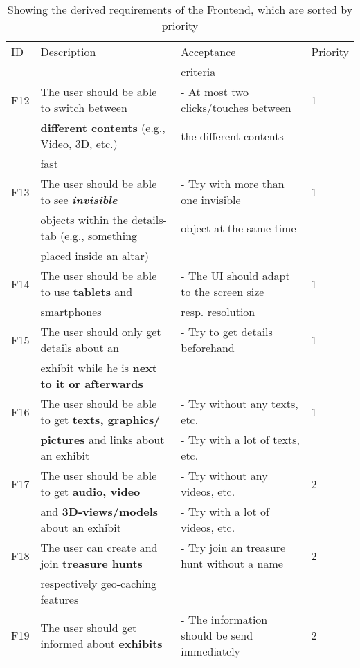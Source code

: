 \documentclass[twoside,openright,fleqn,pointlessnumbers,headinclude,,11pt,a4paper,BCOR5mm,footinclude,cleardoubleempty,abstracton %
                ]{scrreprt}
\begin{document}
	\begin{table}[h]
			\caption{Showing the derived requirements of the Frontend, which are sorted by priority}
	\centering%
	\begin{tabular}{llll}
		\hline
	ID 	& Description 	& Acceptance 	& Priority \\
	 	& 			 & criteria 	&  \\
	\hline
	F12 & The user should be able to switch between 			& - At most two clicks/touches between  	& 1\\
		& \textbf{different contents} (e.g., Video, 3D, etc.)		& the different contents	& \\
		& fast										&	& \\
	\hline
	F13 & The user should be able to see \textbf{\textit{invisible}} 	& - Try with more than one invisible 	& 1\\
		& objects within the details-tab (e.g., something			& object at the same time	& \\
		& placed inside an altar)								&	& \\
	\hline
	F14 & The user should be able to use \textbf{tablets} and 		& - The UI should adapt to the screen size  	& 1\\
		& smartphones									& resp. resolution	& \\
	\hline
	F15 & The user should only get details about an  				& - Try to get details beforehand & 1\\
		& exhibit while he is \textbf{next to it or afterwards} 		&	& \\
	\hline
	F16 & The user should be able to get \textbf{texts, graphics/}  	& - Try without any texts, etc.  & 1\\
		& \textbf{pictures} and links about an exhibit				& - Try with a lot of texts, etc.  	& \\
	\hline
	F17 & The user should be able to get \textbf{audio, video}  		& - Try without any videos, etc.    & 2\\
		& and \textbf{3D-views/models} about an exhibit			& - Try with a lot of videos, etc.  	& \\
	\hline
	F18 & The user can create and join \textbf{treasure hunts} 		& - Try join an treasure hunt without a name & 2\\
		& respectively geo-caching features					&	& \\
	\hline
	F19 & The user should get informed about \textbf{exhibits} 		& - The information should be send immediately  & 2\\

\end{tabular}
\end{table}
\end{document}
